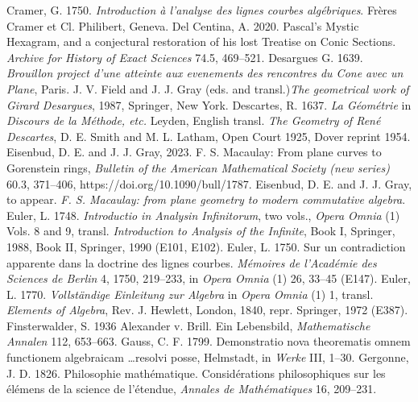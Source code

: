 \newline\indent Cramer, G. 1750. \emph{Introduction \`a l'analyse des lignes courbes alg\'ebriques}. Fr\`eres Cramer et Cl. Philibert, Geneva.
\newline\indent Del Centina, A. 2020. Pascal's Mystic Hexagram, and a conjectural restoration of his lost Treatise on Conic Sections. \emph{Archive for History of Exact Sciences} 74.5, 469--521.
\newline\indent Desargues G. 1639. \emph{Brouillon project d'une atteinte aux evenements des rencontres du Cone avec un Plane}, Paris.  J. V. Field  and J. J. Gray (eds. and transl.)\emph{The geometrical work of Girard Desargues}, 1987, Springer, New York.
\newline\indent Descartes, R. 1637. \emph{La G\'eom\'etrie} in \emph{Discours de la M\'ethode, etc.} Leyden, English transl. \emph{The Geometry of Ren\'e Descartes}, D. E. Smith and M. L. Latham, Open Court 1925, Dover reprint 1954.
\newline\indent Eisenbud, D. E. and J. J. Gray, 2023. F. S. Macaulay: From plane curves to Gorenstein rings, \emph{Bulletin  of the American Mathematical Society (new series)} 
60.3,  371--406, https://doi.org/10.1090/bull/1787.
\newline\indent Eisenbud, D. E. and J. J. Gray, to appear. \emph{F. S. Macaulay: from plane geometry to modern commutative algebra}.
\newline\indent  Euler, L. 1748. \emph{Introductio in Analysin Infinitorum}, two vols., \emph{Opera Omnia} (1) Vols. 8 and 9, transl. \emph{Introduction to Analysis of the Infinite}, Book I,  Springer, 1988, Book II, Springer, 1990 (E101, E102).
\newline\indent  Euler, L. 1750.  Sur un contradiction apparente dans la doctrine des lignes courbes. \emph{M\'emoires de l'Acad\'emie des Sciences de Berlin} 4, 1750, 219--233, in  \emph{Opera Omnia} (1)   26, 33--45 (E147).
\newline\indent Euler, L. 1770. \emph{Vollst\"andige Einleitung zur Algebra} in \emph{Opera Omnia} (1) 1,  transl. \emph{Elements of Algebra}, Rev. J. Hewlett, London, 1840, repr.  Springer, 1972 (E387).
\newline\indent Finsterwalder, S. 1936 Alexander v. Brill. Ein Lebensbild, \emph{Mathematische Annalen} 112, 653--663.
\newline\indent Gauss, C. F.  1799. Demonstratio nova theorematis omnem functionem algebraicam \ldots resolvi posse, Helmstadt, in \emph{Werke} III, 1--30.
\newline\indent Gergonne, J. D. 1826. Philosophie math\'ematique. Consid\'erations philo\-sophiques sur les \'el\'emens de la science de l'\'etendue, \emph{Annales de Math\'ematiques} 16, 209--231.
